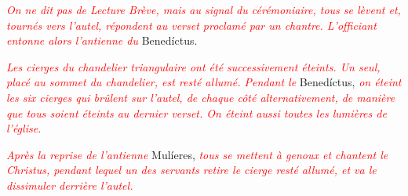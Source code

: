 \documentclass[11pt,a4paper,twoside]{article} %
\begin{document}


\nopagebreak
{}







\textcolor{red}{\itshape On ne dit pas de Lecture Brève, mais au signal du
cérémoniaire, tous se lèvent et, tournés vers l’autel, répondent au verset
proclamé par un chantre. L’officiant entonne alors l’antienne du} Benedíctus.

\nopagebreak
{}











\textcolor{red}{\itshape Les cierges du chandelier triangulaire ont été
successivement éteints. Un seul, placé au sommet du chandelier, est resté allumé.
Pendant le} Benedíctus, \textcolor{red}{\itshape on éteint les six cierges qui
brûlent sur l’autel, de chaque côté alternativement, de manière que tous soient
éteints au dernier verset. On éteint aussi toutes les lumières de l’église.}

\textcolor{red}{\itshape Après la reprise de l’antienne} Mulíeres, %
\textcolor{red}{\itshape tous se mettent à genoux et chantent le Christus, %
pendant lequel un des servants retire le cierge resté allumé, et va le dissimuler
derrière l’autel.}


\nopagebreak
{}
\end{document}
